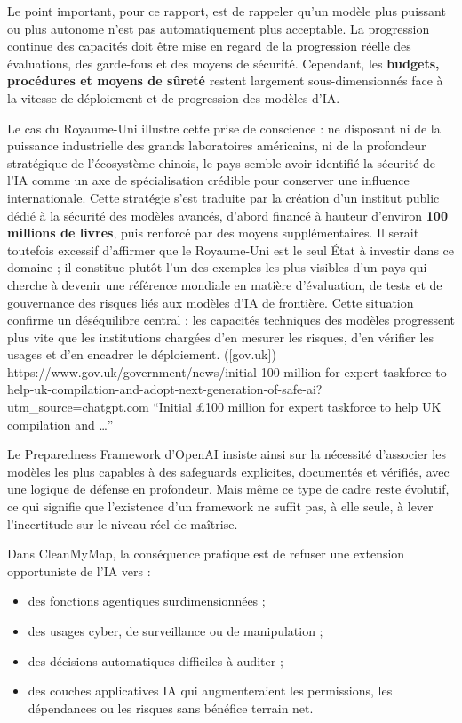\documentclass[
  10pt,
  a4paper,
  DIV=11,
  numbers=noendperiod,
  oneside]{scrreprt}
\providecommand{\tightlist}{%
  \setlength{\itemsep}{0pt}\setlength{\parskip}{0pt}}
\let\oldtextbf\textbf
\renewcommand{\textbf}[1]{\oldtextbf{\textcolor{cmmnavy}{#1}}}
\begin{document}
Le point important, pour ce rapport, est de rappeler qu'un modèle plus
puissant ou plus autonome n'est pas automatiquement plus acceptable. La
progression continue des capacités doit être mise en regard de la
progression réelle des évaluations, des garde-fous et des moyens de
sécurité. Cependant, les \textbf{budgets, procédures et moyens de
sûreté} restent largement sous-dimensionnés face à la vitesse de
déploiement et de progression des modèles d'IA.

Le cas du Royaume-Uni illustre cette prise de conscience : ne disposant
ni de la puissance industrielle des grands laboratoires américains, ni
de la profondeur stratégique de l'écosystème chinois, le pays semble
avoir identifié la sécurité de l'IA comme un axe de spécialisation
crédible pour conserver une influence internationale. Cette stratégie
s'est traduite par la création d'un institut public dédié à la sécurité
des modèles avancés, d'abord financé à hauteur d'environ \textbf{100
millions de livres}, puis renforcé par des moyens supplémentaires. Il
serait toutefois excessif d'affirmer que le Royaume-Uni est le seul État
à investir dans ce domaine ; il constitue plutôt l'un des exemples les
plus visibles d'un pays qui cherche à devenir une référence mondiale en
matière d'évaluation, de tests et de gouvernance des risques liés aux
modèles d'IA de frontière. Cette situation confirme un déséquilibre
central : les capacités techniques des modèles progressent plus vite que
les institutions chargées d'en mesurer les risques, d'en vérifier les
usages et d'en encadrer le déploiement. ({[}gov.uk{]})
https://www.gov.uk/government/news/initial-100-million-for-expert-taskforce-to-help-uk-compilation-and-adopt-next-generation-of-safe-ai?utm\_source=chatgpt.com
``Initial £100 million for expert taskforce to help UK compilation and
\ldots{}''

Le Preparedness Framework d'OpenAI insiste ainsi sur la nécessité
d'associer les modèles les plus capables à des safeguards explicites,
documentés et vérifiés, avec une logique de défense en profondeur. Mais
même ce type de cadre reste évolutif, ce qui signifie que l'existence
d'un framework ne suffit pas, à elle seule, à lever l'incertitude sur le
niveau réel de maîtrise.

Dans CleanMyMap, la conséquence pratique est de refuser une extension
opportuniste de l'IA vers :

\begin{itemize}
\tightlist
\item
  des fonctions agentiques surdimensionnées ;
\item
  des usages cyber, de surveillance ou de manipulation ;
\item
  des décisions automatiques difficiles à auditer ;
\item
  des couches applicatives IA qui augmenteraient les permissions, les
  dépendances ou les risques sans bénéfice terrain net.
\end{itemize}
\end{document}
